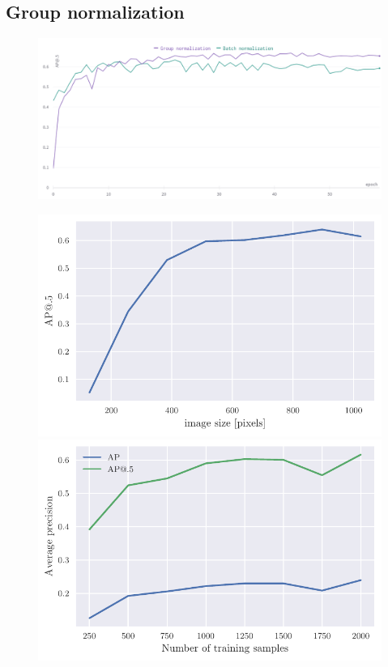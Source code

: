 \subsection{Group normalization}
\begin{figure}
    \centering
    \includegraphics[width=\linewidth]{images/batch_norm_group_norm.png}
\end{figure}




\begin{figure}
    \begin{floatrow}[2]
        \includegraphics[width=0.5\linewidth]{images/img_size_dependency.pdf}\qquad
        \includegraphics[width=0.5\linewidth]{images/training_set_dependency.pdf}\qquad
    \end{floatrow}
\end{figure}

